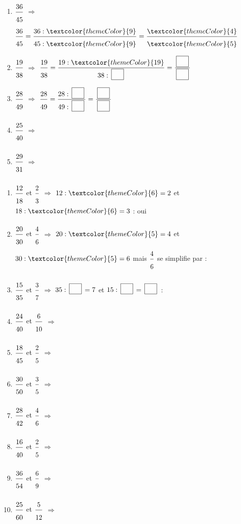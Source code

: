 \begin{enumerate}[leftmargin=*,align=parleft, label=\alph*), itemsep=9pt, start=6]
\item $\FA{36}{45}$ \quad $\Longrightarrow$ \quad $\FA{36}{45}=\FA{36 : \textcolor{themeColor}{9}}{45 : \textcolor{themeColor}{9}}=\FA{\textcolor{themeColor}{4}}{\textcolor{themeColor}{5}}$
\item $\FA{19}{38}$ \quad $\Longrightarrow$ \quad $\FA{19}{38}=\FA{19 : \textcolor{themeColor}{19}}{38 : \CaseC}=\FA{\CaseC}{\CaseC}$
\item $\FA{28}{49}$ \quad $\Longrightarrow$ \quad $\FA{28}{49}=\FA{28 : \CaseC}{49 : \CaseC}=\FA{\CaseC}{\CaseC}$
\item $\FA{25}{40}$ \quad $\Longrightarrow$
\item $\FA{29}{31}$ \quad $\Longrightarrow$
\end{enumerate}

\newpage
{}

\begin{enumerate}[leftmargin=*,align=parleft, label=\alph*), itemsep=9pt]
\item $\FA{12}{18}$ et $\FA{2}{3}$ \quad $\Longrightarrow$ \quad $12 : \textcolor{themeColor}{6}=2$ \quad et \quad $18 : \textcolor{themeColor}{6}=3$ \quad : \quad \textcolor{themeColor}{oui}
\item $\FA{20}{30}$ et $\FA{4}{6}$ \quad $\Longrightarrow$ \quad $20 : \textcolor{themeColor}{5}=4$ \quad et \quad $30 : \textcolor{themeColor}{5}=6$ \quad mais \quad $\FA{4}{6}$ se simplifie par \CaseC \quad : \quad \Case
\item $\FA{15}{35}$ et $\FA{3}{7}$ \quad $\Longrightarrow$ \quad $35 : \CaseC=7$ \quad et \quad $15 : \CaseC=\CaseC$ \quad : \quad \Case
\item $\FA{24}{40}$ et $\FA{6}{10}$ \quad $\Longrightarrow$
\item $\FA{18}{45}$ et $\FA{2}{5}$ \quad $\Longrightarrow$
\item $\FA{30}{50}$ et $\FA{3}{5}$ \quad $\Longrightarrow$
\item $\FA{28}{42}$ et $\FA{4}{6}$ \quad $\Longrightarrow$
\item $\FA{16}{40}$ et $\FA{2}{5}$ \quad $\Longrightarrow$
\item $\FA{36}{54}$ et $\FA{6}{9}$ \quad $\Longrightarrow$
\item $\FA{25}{60}$ et $\FA{5}{12}$ \quad $\Longrightarrow$
\end{enumerate}

